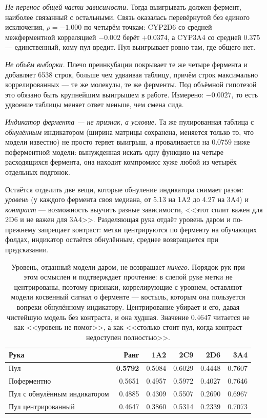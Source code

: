 \emph{Не перенос общей части зависимости.} Тогда выигрывать должен фермент, наиболее связанный
с остальными. Связь оказалась перевёрнутой без единого исключения, $\rho = -1.000$ по четырём
точкам: CYP2D6 со средней межферментной корреляцией $-0.002$ берёт $+0.0374$, а CYP3A4 со
средней $0.375$ --- единственный, кому пул вредит. Пул выигрывает ровно там, где общего нет.

\emph{Не объём выборки.} Плечо преинкубации покрывает те же четыре фермента и добавляет 6538
строк, больше чем удваивая таблицу, причём строк максимально коррелированных --- те же молекулы,
те же ферменты. Под объёмной гипотезой это обязано быть крупнейшим выигрышем в работе.
Измерено: $-0.0027$, то есть удвоение таблицы меняет ответ меньше, чем смена сида.

\emph{Индикатор фермента --- не признак, а условие.} Та же пулированная таблица с
\emph{обнулённым} индикатором (ширина матрицы сохранена, меняется только то, что модели
известно) не просто теряет выигрыш, а проваливается на $0.0759$ ниже поферментной модели:
вынужденная искать одну функцию на четыре расходящихся фермента, она находит компромисс хуже
любой из четырёх отдельных подгонок.

Остаётся отделить две вещи, которые обнуление индикатора снимает разом: \emph{уровень}
(у каждого фермента своя медиана, от 5.13 на 1A2 до 4.27 на 3A4) и \emph{контраст} ---
возможность выучить разные зависимости, <<этот сплит важен для 2D6 и не важен для 3A4>>.
Разделяющая рука отдаёт уровень даром и по-прежнему запрещает контраст: метки центрируются по
ферменту на обучающих фолдах, индикатор остаётся обнулённым, среднее возвращается при
предсказании.

\begin{table}[htbp]\centering\small
\begin{tabularx}{\textwidth}{@{}Xrrrrr@{}}
\toprule
Рука & Ранг & 1A2 & 2C9 & 2D6 & 3A4 \\
\midrule
Пул & \textbf{0.5792} & 0.5084 & 0.6029 & 0.4448 & 0.7607 \\
Поферментно & 0.5651 & 0.4957 & 0.5972 & 0.4027 & 0.7646 \\
Пул с обнулённым индикатором & 0.4885 & 0.4309 & 0.5507 & 0.2690 & 0.6967 \\
Пул центрированный & 0.4647 & 0.3860 & 0.5314 & 0.2339 & 0.7073 \\
\bottomrule
\end{tabularx}
\caption{Уровень, отданный модели даром, не возвращает \emph{ничего}. Порядок рук при этом
осмыслен и подтверждает прочтение: в слепой руке метки не центрированы, поэтому признаки,
коррелирующие с уровнем, оставляют модели косвенный сигнал о ферменте --- костыль, которым она
пользуется вопреки обнулённому индикатору. Центрирование убирает и его, давая чистейшую модель
без контраста, и она худшая. Значение 0.4647 читается не как <<уровень не помог>>, а как
<<столько стоит пул, когда контраст недоступен полностью>>.}
\label{tab:poolwhy}
\end{table}

